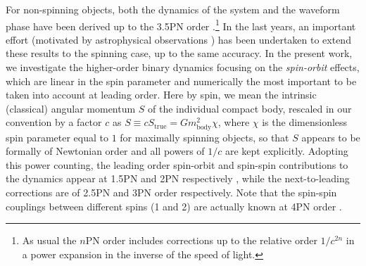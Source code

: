 \documentclass[
superscriptaddress,
preprint,
prd,tightenlines,showpacs,nofootinbib,
eqsecnum,
amsfonts,amsmath,amssymb]{revtex4-1}
\begin{document}
For non-spinning objects, both the dynamics of the system and the
waveform phase have been derived up to the 3.5PN order
\cite{Blanchet2004a,Arun2004,Blanchet2002}.\footnote{As usual the
  $n$PN order includes corrections up to the relative order
  $1/c^{2n}$ in a power expansion in the inverse of the speed of
  light.} In the last years, an important effort (motivated by
astrophysical observations
\cite{Abramowicz2001,Strohmayer2001b,McClintock2006,Gou2011,Nowak2012})
has been undertaken to extend these results to the spinning case, up
to the same accuracy. In the present work, we investigate the
higher-order binary dynamics focusing on the \textit{spin-orbit}
effects, which are linear in the spin parameter and numerically the
most important to be taken into account at leading order. Here by
spin, we mean the intrinsic (classical) angular momentum $S$ of the
individual compact body, rescaled in our convention by a factor $c$ as
$S\equiv c S_{\text{true}}=G m_{\text{body}}^2 \chi$, where $\chi$ is
the dimensionless spin parameter equal to $1$ for maximally spinning
objects, so that $S$ appears to be formally of Newtonian order and all
powers of $1/c$ are kept explicitly. Adopting this power counting, the
leading order spin-orbit and spin-spin contributions to the dynamics
appear at 1.5PN and 2PN respectively
\cite{Barker1975b,BarkerOConnell2,KWW93,Kidder1995,Goldberger2006,Porto2006},
while the next-to-leading corrections are of 2.5PN
\cite{Owen1998,Tagoshi2001,Faye2006,Damour2008a,Levi2010a,Porto2010a}
and 3PN order \cite{Hergt2010,Steinhoff2008,Hartung2011a,Porto2008a,Porto2008b}
respectively. Note that the spin-spin couplings between different
spins (1 and 2) are actually known at 4PN order
\cite{Levi2012a,Hartung2011c}.
\end{document}
